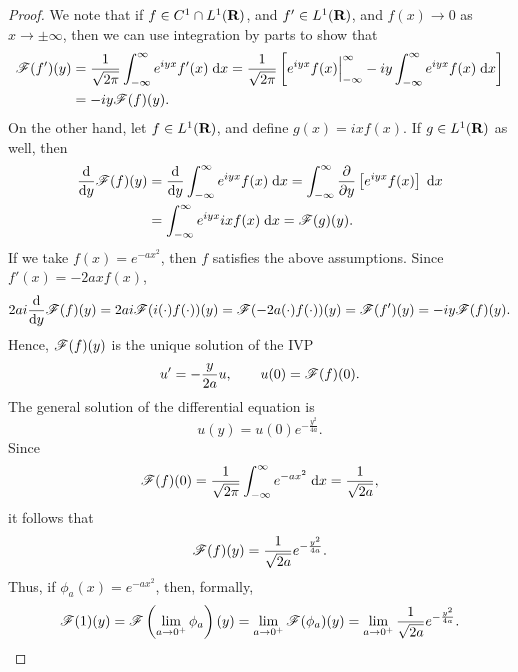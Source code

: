 \documentclass{homework}
\begin{document}
\begin{arabicparts}
		\begin{proof}
			We note that if $f \in C^1\cap L^1(\textnormal{\bf R})$, and $f' \in L^1(\textnormal{\bf R})$, and $f(x)\to 0$ as $x\to\pm\infty$, then we can use integration by parts to show that
			\begin{align}
				\mathscr{F}(f')(y) &= \frac{1}{\sqrt{2\pi}}\int_{-\infty}^\infty e^{iyx}f'(x)\;\text{d} x = \frac{1}{\sqrt{2\pi}}\left[e^{iyx}f(x)\Big\vert_{-\infty}^\infty - iy\int_{-\infty}^\infty e^{iyx}f(x)\;\text{d} x\right] \\
				&= -iy\mathscr{F}(f)(y).
			\end{align}
			On the other hand, let $f\in L^1(\textnormal{\bf R})$, and define $g(x) = ixf(x)$. If $g \in L^1(\textnormal{\bf R})$ as well, then
			\begin{align}
				\frac{\text{d} {}}{\text{d} {y}} \mathscr{F}(f)(y) &= \frac{\text{d} {}}{\text{d} {y}}\int_{-\infty}^\infty e^{iyx}f(x)\;\text{d} x =\int_{-\infty}^\infty \frac{\partial }{\partial y}\left[e^{iyx}f(x)\right]\;\text{d} x \\
				&= \int_{-\infty}^\infty e^{iyx}ixf(x)\;\text{d} x = \mathscr{F}(g)(y).
			\end{align}
			If we take $f(x) = e^{-ax^2}$, then $f$ satisfies the above assumptions. Since $f'(x) = -2axf(x)$,
			\begin{equation}
				2ai \frac{\text{d} {}}{\text{d} {y}}\mathscr{F}(f)(y) = 2ai\mathscr{F}(i(\cdot)f(\cdot))(y) = \mathscr{F}(-2a(\cdot)f(\cdot))(y) = \mathscr{F}(f')(y) =-iy\mathscr{F}(f)(y).
			\end{equation}
			Hence, $\mathscr{F}(f)(y)$ is the unique solution of the IVP
			\begin{equation}
				u' = -\frac{y}{2a}u,\qquad u(0) = \mathscr{F}(f)(0).
			\end{equation}
			The general solution of the differential equation is
			\begin{equation}
				u(y) = u(0)e^{-\frac{y^2}{4a}}.
			\end{equation}
			Since
			\begin{equation}
				\mathscr{F}(f)(0) = \frac{1}{\sqrt{2\pi}}\int_{-\infty}^\infty e^{-ax^2}\;\text{d} x = \frac{1}{\sqrt{2a}},
			\end{equation}
			it follows that
			\begin{equation}
				\label{eq:gaussian_fourier_transform}
				\mathscr{F}(f)(y) = \frac{1}{\sqrt{2a}} e^{-\frac{y^2}{4a}}.
			\end{equation}
			Thus, if $\phi_a(x) = e^{-ax^2}$, then, formally,
			\begin{equation}
				\fourier(1)(y) = \fourier\left(\lim_{a\to 0^+}\phi_a\right)(y) = \lim_{a\to 0^+}\fourier(\phi_a)(y)= \lim_{a\to 0^+}\frac{1}{\sqrt{2a}}e^{-\frac{y^2}{4a}}.

\end{equation}
\end{proof}
\end{arabicparts}
\end{document}
